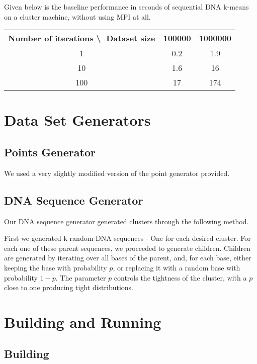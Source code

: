 \documentclass[12pt]{article}
\begin{document}
Given below is the baseline performance in seconds of sequential DNA k-means on a cluster machine, without using MPI at all.

\begin{tabular}{| c |c | c |}
\hline
    Number of iterations \textbackslash $\;$ Dataset size & 100000 & 1000000 \\
    \hline
    1                                                &   0.2  &     1.9 \\
    10                                               &   1.6  &      16 \\
    100                                              &    17  &     174 \\
    \hline
\end{tabular}

\section{Data Set Generators}

\subsection{Points Generator}

We used a very slightly modified version of the point generator provided.

\subsection{DNA Sequence Generator}

Our DNA sequence generator generated clusters through the following method.

First we generated k random DNA sequences - One for each desired cluster. For each one of these parent sequences, we proceeded to generate children. Children are generated by iterating over all bases of the parent, and, for each base, either keeping the base with probability $p$, or replacing it with a random base with probability $1-p$. The parameter $p$ controls the tightness of the cluster, with a $p$ close to one producing tight distributions.

\section{Building and Running}
 
\subsection{Building}
\end{document}
